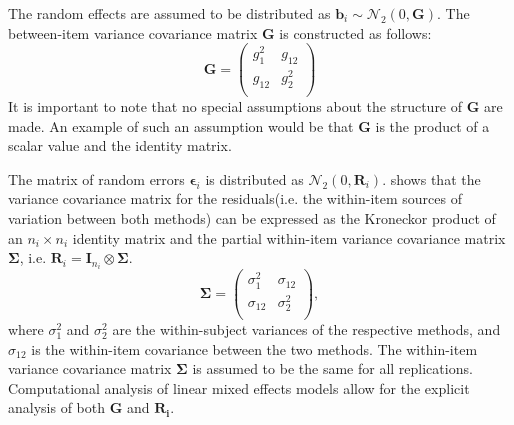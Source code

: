 \documentclass[12pt, a4paper]{report}
\theoremstyle{plain}
\theoremstyle{definition}
\theoremstyle{remark}
\begin{document}
		\bigskip
		
		The random effects are assumed to be distributed as $\boldsymbol{b}_i \sim \mathcal{N}_2(0,\boldsymbol{G})$. The between-item variance covariance matrix $\boldsymbol{G}$ is constructed as follows:
		\[ \boldsymbol{G} =\left(
		\begin{array}{cc}
		g^2_1  & g_{12} \\
		g_{12} & g^2_2 \\
		\end{array}
		\right) \]
		It is important to note that no special assumptions about the structure of $\boldsymbol{G}$ are made. An example of such an assumption would be that $\boldsymbol{G}$ is the product of a scalar value and the identity matrix.
		
		
		The matrix of random errors $\boldsymbol{\epsilon}_i$ is distributed as $\mathcal{N}_2(0,\boldsymbol{R}_i)$.
		\citet{hamlett} shows that the variance covariance matrix for the residuals(i.e. the within-item sources of variation between both methods) can be expressed as the Kroneckor product of an $n_i \times n_i$ identity matrix and the partial within-item variance covariance matrix $\boldsymbol{\Sigma}$, i.e. $\boldsymbol{R}_{i} = \boldsymbol{I}_{n_{i}} \otimes \boldsymbol{\Sigma}$.
		\[
		\boldsymbol{\Sigma} = \left( \begin{array}{cc}
		\sigma^2_{1} & \sigma_{12} \\
		\sigma_{12} & \sigma^2_{2} \\
		\end{array}\right),
		\]
		where $\sigma^2_{1}$ and $\sigma^2_{2}$ are the within-subject variances of the respective methods, and $\sigma_{12}$ is the within-item covariance between the two methods. The within-item variance covariance matrix $\boldsymbol{\Sigma}$ is assumed to be the same for all replications. Computational analysis of linear mixed effects models allow for the explicit analysis of both $\boldsymbol{G}$ and $\boldsymbol{R_i}$. 
		
\end{document}
